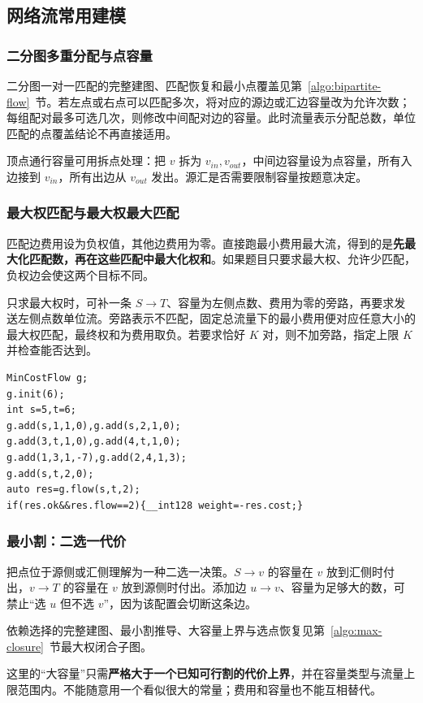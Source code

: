 \subsection{网络流常用建模}
\label{math:flow-models}
\subsubsection*{二分图多重分配与点容量}
二分图一对一匹配的完整建图、匹配恢复和最小点覆盖见第~\ref{algo:bipartite-flow}~节。若左点或右点可以匹配多次，将对应的源边或汇边容量改为允许次数；每组配对最多可选几次，则修改中间配对边的容量。此时流量表示分配总数，单位匹配的点覆盖结论不再直接适用。

顶点通行容量可用拆点处理：把 $v$ 拆为 $v_{in},v_{out}$，中间边容量设为点容量，所有入边接到 $v_{in}$，所有出边从 $v_{out}$ 发出。源汇是否需要限制容量按题意决定。

\subsubsection*{最大权匹配与最大权最大匹配}
匹配边费用设为负权值，其他边费用为零。直接跑最小费用最大流，得到的是\textbf{先最大化匹配数，再在这些匹配中最大化权和}。如果题目只要求最大权、允许少匹配，负权边会使这两个目标不同。

只求最大权时，可补一条 $S\to T$、容量为左侧点数、费用为零的旁路，再要求发送左侧点数单位流。旁路表示不匹配，固定总流量下的最小费用便对应任意大小的最大权匹配，最终权和为费用取负。若要求恰好 $K$ 对，则不加旁路，指定上限 $K$ 并检查能否达到。

\begin{lstlisting}[style=mtycpp,numbers=none]
MinCostFlow g;
g.init(6);
int s=5,t=6;
g.add(s,1,1,0),g.add(s,2,1,0);
g.add(3,t,1,0),g.add(4,t,1,0);
g.add(1,3,1,-7),g.add(2,4,1,3);
g.add(s,t,2,0);
auto res=g.flow(s,t,2);
if(res.ok&&res.flow==2){__int128 weight=-res.cost;}
\end{lstlisting}

\subsubsection*{最小割：二选一代价}
把点位于源侧或汇侧理解为一种二选一决策。$S\to v$ 的容量在 $v$ 放到汇侧时付出，$v\to T$ 的容量在 $v$ 放到源侧时付出。添加边 $u\to v$、容量为足够大的数，可禁止“选 $u$ 但不选 $v$”，因为该配置会切断这条边。

依赖选择的完整建图、最小割推导、大容量上界与选点恢复见第~\ref{algo:max-closure}~节最大权闭合子图。

这里的“大容量”只需\textbf{严格大于一个已知可行割的代价上界}，并在容量类型与流量上限范围内。不能随意用一个看似很大的常量；费用和容量也不能互相替代。

